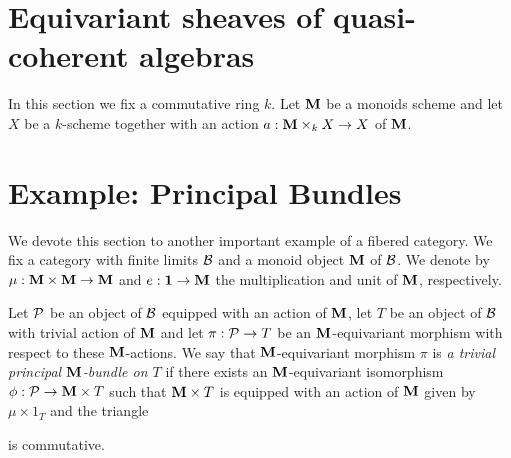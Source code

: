 \section{Equivariant sheaves of quasi-coherent algebras}
\noindent
In this section we fix a commutative ring $k$.    
Let $\mathbf{M}$ be a monoids scheme and let $X$ be a $k$-scheme together with an action $a:\mathbf{M}\times_kX\rightarrow X$ of $\mathbf{M}$.


\section{Example: Principal Bundles}
\noindent
We devote this section to another important example of a fibered category. We fix a category with finite limits ${\mathcal B}$ and a monoid object $\mathbf{M}$ of ${\mathcal B}$. We denote by $\mu:\mathbf{M}\times \mathbf{M}\rightarrow \mathbf{M}$ and $e:\mathbf{1}\rightarrow \mathbf{M}$ the multiplication and unit of $\mathbf{M}$, respectively.

\begin{definition}
Let ${\mathcal P}$ be an object of ${\mathcal B}$ equipped with an action of $\mathbf{M}$, let $T$ be an object of ${\mathcal B}$ with trivial action of $\mathbf{M}$ and let $\pi:{\mathcal P}\rightarrow T$ be an $\mathbf{M}$-equivariant morphism with respect to these $\mathbf{M}$-actions. We say that $\mathbf{M}$-equivariant morphism $\pi$ is \textit{a trivial principal $\mathbf{M}$-bundle on $T$} if there exists an $\mathbf{M}$-equivariant isomorphism $\phi:{\mathcal P}\rightarrow \mathbf{M}\times T$ such that $\mathbf{M}\times T$ is equipped with an action of $\mathbf{M}$ given by $\mu\times 1_T$ and the triangle
\begin{center}
\end{center}
is commutative.
\end{definition}

